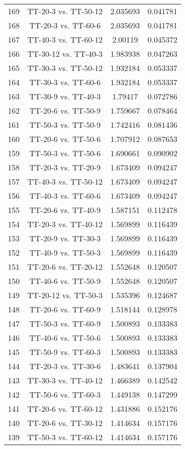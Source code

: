 \documentclass[a4paper,10pt]{article}
\begin{document}
\begin{landscape}
\begin{table}[!htp]
\begin{tabular}{cccc}
169&TT-20-3 vs. TT-50-12&2.035693&0.041781\\
168&TT-20-3 vs. TT-60-6&2.035693&0.041781\\
167&TT-40-3 vs. TT-60-12&2.00119&0.045372\\
166&TT-30-12 vs. TT-40-3&1.983938&0.047263\\
165&TT-30-3 vs. TT-50-12&1.932184&0.053337\\
164&TT-30-3 vs. TT-60-6&1.932184&0.053337\\
163&TT-30-9 vs. TT-40-3&1.79417&0.072786\\
162&TT-20-6 vs. TT-50-9&1.759667&0.078464\\
161&TT-50-3 vs. TT-50-9&1.742416&0.081436\\
160&TT-20-6 vs. TT-50-6&1.707912&0.087653\\
159&TT-50-3 vs. TT-50-6&1.690661&0.090902\\
158&TT-20-3 vs. TT-20-9&1.673409&0.094247\\
157&TT-40-3 vs. TT-50-12&1.673409&0.094247\\
156&TT-40-3 vs. TT-60-6&1.673409&0.094247\\
155&TT-20-6 vs. TT-40-9&1.587151&0.112478\\
154&TT-20-3 vs. TT-40-12&1.569899&0.116439\\
153&TT-20-9 vs. TT-30-3&1.569899&0.116439\\
152&TT-40-9 vs. TT-50-3&1.569899&0.116439\\
151&TT-20-6 vs. TT-20-12&1.552648&0.120507\\
150&TT-40-6 vs. TT-50-9&1.552648&0.120507\\
149&TT-20-12 vs. TT-50-3&1.535396&0.124687\\
148&TT-20-6 vs. TT-60-9&1.518144&0.128978\\
147&TT-50-3 vs. TT-60-9&1.500893&0.133383\\
146&TT-40-6 vs. TT-50-6&1.500893&0.133383\\
145&TT-50-9 vs. TT-60-3&1.500893&0.133383\\
144&TT-20-3 vs. TT-30-6&1.483641&0.137904\\
143&TT-30-3 vs. TT-40-12&1.466389&0.142542\\
142&TT-50-6 vs. TT-60-3&1.449138&0.147299\\
141&TT-20-6 vs. TT-60-12&1.431886&0.152176\\
140&TT-20-6 vs. TT-30-12&1.414634&0.157176\\
139&TT-50-3 vs. TT-60-12&1.414634&0.157176\\

\end{tabular}
\end{table}
\end{landscape}
\end{document}
